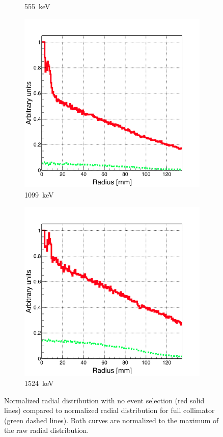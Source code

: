 \begin{figure}
\begin{subfigure}{.5\textwidth}
  \caption{555~keV}
  \label{chap5::fig::rad_distr_fullAbs_555keV}
\end{subfigure}
\begin{subfigure}{.5\textwidth}
  \centering
  \includegraphics[width=.9\linewidth]{03_GraphicFiles/chapter5_SPECTsimu/SPECT/anger/no_holes/overlap_infAbs_1099keV_normMax}
  \caption{1099~keV}
  \label{chap5::fig::rad_distr_fullAbs_1099keV}
\end{subfigure}
\begin{subfigure}{.5\textwidth}
  \centering
  \includegraphics[width=.9\linewidth]{03_GraphicFiles/chapter5_SPECTsimu/SPECT/anger/no_holes/overlap_infAbs_1524keV_normMax}
  \caption{1524~keV}
  \label{chap5::fig::rad_distr_fullAbs_1524keV}
\end{subfigure}
\caption{Normalized radial distribution with no event selection (red solid lines) compared to normalized radial distribution for full collimator (green dashed lines). Both curves are normalized to the maximum of the raw radial distribution.}
\label{chap5::fig::distr_fullAbs}
\end{figure}

